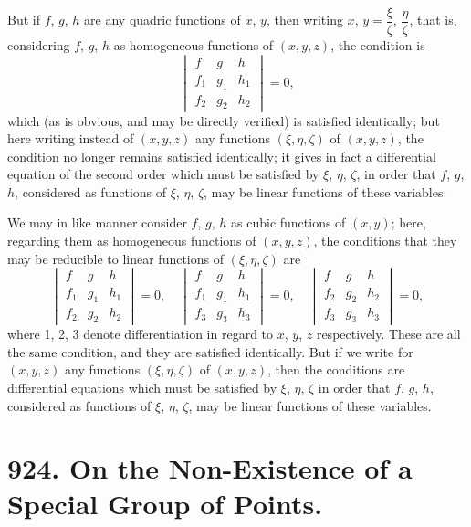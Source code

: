 \documentclass[11pt,a4paper]{book}
\begin{document}
But if $f$, $g$, $h$ are any quadric functions of $x$, $y$, then writing $x$, $y = \dfrac{\xi}{\zeta}$,
$\dfrac{\eta}{\zeta}$, that is, considering $f$, $g$, $h$ as homogeneous functions of $(x, y, z)$, the
condition is
\[
\begin{vmatrix}
f & g & h\\
f_1 & g_1 & h_1\\
f_2 & g_2 & h_2
\end{vmatrix} = 0,
\]
which (as is obvious, and may be directly verified) is satisfied identically; but here
writing instead of $(x, y, z)$ any functions $(\xi, \eta, \zeta)$ of $(x, y, z)$, the condition no longer
remains satisfied identically; it gives in fact a differential equation of the second
order which must be satisfied by $\xi$, $\eta$, $\zeta$, in order that $f$, $g$, $h$, considered as functions
of $\xi$, $\eta$, $\zeta$, may be linear functions of these variables.

\newpage
We may in like manner consider $f$, $g$, $h$ as cubic functions of $(x, y)$; here, regarding
them as homogeneous functions of $(x, y, z)$, the conditions that they may be reducible
to linear functions of $(\xi, \eta, \zeta)$ are
\[
\begin{vmatrix}
f & g & h\\
f_1 & g_1 & h_1\\
f_2 & g_2 & h_2
\end{vmatrix} = 0,
\quad
\begin{vmatrix}
f & g & h\\
f_1 & g_1 & h_1\\
f_3 & g_3 & h_3
\end{vmatrix} = 0,
\quad
\begin{vmatrix}
f & g & h\\
f_2 & g_2 & h_2\\
f_3 & g_3 & h_3
\end{vmatrix} = 0,
\]
where 1, 2, 3 denote differentiation in regard to $x$, $y$, $z$ respectively. These are all
the same condition, and they are satisfied identically. But if we write for $(x, y, z)$
any functions $(\xi, \eta, \zeta)$ of $(x, y, z)$, then the conditions are differential equations which
must be satisfied by $\xi$, $\eta$, $\zeta$ in order that $f$, $g$, $h$, considered as functions of $\xi$, $\eta$, $\zeta$,
may be linear functions of these variables.



\newpage
\section*{924. On the Non-Existence of a Special Group of Points.}
\end{document}
